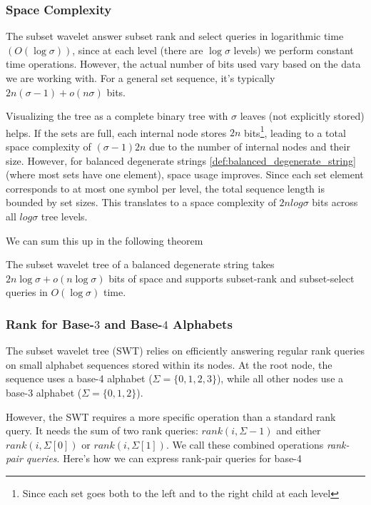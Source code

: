 \subsubsection*{Space Complexity}
The subset wavelet answer subset rank and select queries in logarithmic time $(O(\log \sigma))$, since at each level (there are $\log \sigma$ levels) we perform constant time operations. However, the actual number of bits used vary based on the data we are working with. For a general set sequence, it's typically $2n(\sigma - 1) + o(n\sigma)$ bits.

\noindent Visualizing the tree as a complete binary tree with $\sigma$ leaves (not explicitly stored) helps. If the sets are full, each internal node stores $2n$ bits\footnote{Since each set goes both to the left and to the right child at each level}, leading to a total space complexity of $(\sigma - 1)2n$ due to the number of internal nodes and their size. However, for balanced degenerate strings \ref{def:balanced_degenerate_string} (where most sets have one element), space usage improves. Since each set element corresponds to at most one symbol per level, the total sequence length is bounded by set sizes. This translates to a space complexity of $2n log \sigma$ bits across all $log \sigma$ tree levels.

\noindent We can sum this up in the following theorem

\begin{theorem} \label{thm:swt_space}
    The subset wavelet tree of a balanced degenerate string takes $2n \log \sigma + o(n \log \sigma)$ bits of space and supports subset-rank and subset-select queries in $O(\log \sigma)$ time.
\end{theorem}


\subsubsection*{Rank for Base-$3$ and Base-$4$ Alphabets}

The subset wavelet tree (SWT) relies on efficiently answering regular rank queries on small alphabet sequences stored within its nodes. At the root node, the sequence uses a base-4 alphabet ($\Sigma = \{0, 1, 2, 3\}$), while all other nodes use a base-3 alphabet ($\Sigma = \{0, 1, 2\}$).

\noindent However, the SWT requires a more specific operation than a standard rank query. It needs the sum of two rank queries: $rank(i, \Sigma - 1)$ and either $rank(i, \Sigma[0])$ or $rank(i, \Sigma[1])$. We call these combined operations \emph{rank-pair queries}. Here's how we can express rank-pair queries for base-4

